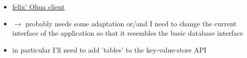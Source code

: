 \begin{itemize}
    \item \href{https://github.com/Feliix42/YCSB/blob/master/ohua/src/main/java/site/ycsb/db/OhuaClient.java}{felix' Ohua client}
    \item  $\rightarrow$ probably needs some adaptation or/and I need to change the current interface of the application so that it resembles the basic database interface
    \item in particular I'll need to add 'tables' to the key-value-store API
\end{itemize}

